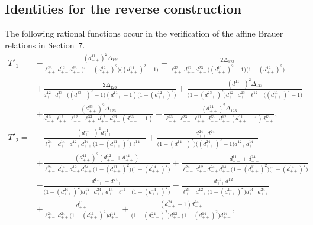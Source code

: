 \documentclass[a4,10pt]{amsart}
\numberwithin{equation}{section}
\theoremstyle{definition}
\begin{document}
\subsection{Identities for the reverse construction} The following rational functions occur in the verification of the
affine Brauer relations in Section~7.
\begingroup
\small
\allowdisplaybreaks[4]
\begin{align*}
T'_1={}&
-\frac{(d^{11}_{++})^2\Delta_{123}}
{\ell^{23}_{++}d^{12}_{+-}d^{23}_{+-}
 \bigl(1-(d^{12}_{++})^2\bigr)\bigl((d^{11}_{++})^2-1\bigr)}
+\frac{2\Delta_{123}}
{\ell^{33}_{++}d^{12}_{+-}d^{23}_{+-}
 \bigl((d^{11}_{++})^2-1\bigr)\bigl(1-(d^{12}_{++})^2\bigr)}
\\
&+\frac{2\Delta_{123}}
{d^{12}_{+-}d^{23}_{+-}\bigl((d^{33}_{++})^2-1\bigr)
 (d^{11}_{++}-1)\bigl(1-(d^{12}_{++})^2\bigr)}
+\frac{(d^{11}_{++})^2\Delta_{123}}
{\bigl(1-(d^{23}_{++})^2\bigr)d^{12}_{+-}d^{23}_{+-}
 \ell^{12}_{--}\bigl((d^{11}_{++})^2-1\bigr)}
\\
&+\frac{(d^{33}_{++})^2\Delta_{123}}
{d^{13}_{-+}\ell^{12}_{++}\ell^{12}_{--}\ell^{33}_{++}
 d^{12}_{+-}d^{23}_{+-}(d^{33}_{++}-1)}
-\frac{(d^{11}_{++})^2\Delta_{123}}
{\ell^{23}_{++}\ell^{23}_{--}\ell^{11}_{++}
 d^{23}_{+-}d^{12}_{+-}(d^{11}_{++}-1)d^{13}_{-+}},\\[2mm] 
T'_2={}&
-\frac{(d^{11}_{++})^2d^{14}_{++}}
{\ell^{24}_{+-}d^{14}_{+-}d^{12}_{-+}d^{24}_{++}
 \bigl(1-(d^{11}_{++})^2\bigr)\ell^{14}_{--}}
+\frac{d^{24}_{++}d^{24}_{+-}}
{\bigl(1-(d^{14}_{++})^2\bigr)\bigl((d^{24}_{++})^2-1\bigr)
 d^{12}_{-+}d^{14}_{+-}}
\\
&+\frac{(d^{11}_{++})^2(d^{12}_{+-}+d^{44}_{++})}
{\ell^{24}_{+-}d^{14}_{+-}d^{12}_{-+}d^{24}_{++}
 \bigl(1-(d^{11}_{++})^2\bigr)\bigl(1-(d^{14}_{++})^2\bigr)}
+\frac{d^{11}_{++}+d^{24}_{++}}
{\ell^{24}_{--}d^{12}_{+-}d^{24}_{++}d^{14}_{+-}
 \bigl(1-(d^{11}_{++})^2\bigr)\bigl(1-(d^{14}_{++})^2\bigr)}
\\
&-\frac{d^{11}_{++}+d^{24}_{++}}
{\bigl(1-(d^{24}_{++})^2\bigr)d^{12}_{+-}d^{24}_{++}d^{14}_{+-}
 \ell^{11}_{--}\bigl(1-(d^{14}_{++})^2\bigr)}
-\frac{d^{11}_{++}d^{12}_{++}}
{\ell^{24}_{+-}d^{12}_{-+}\bigl(1-(d^{11}_{++})^2\bigr)
 d^{14}_{+-}d^{24}_{++}}
\\
&+\frac{d^{11}_{++}}
{\ell^{24}_{+-}d^{24}_{++}\bigl(1-(d^{11}_{++})^2\bigr)d^{14}_{+-}}
+\frac{(d^{24}_{-+}-1)d^{24}_{++}}
{\bigl(1-(d^{24}_{++})^2\bigr)d^{12}_{+-}
 \bigl(1-(d^{14}_{++})^2\bigr)d^{14}_{+-}},\\[2mm] \\

\end{align*}
\end{document}
